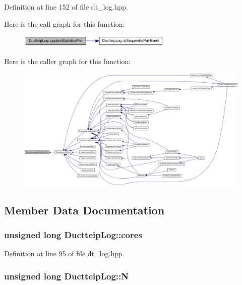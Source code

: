 Definition at line 152 of file dt\_\-log.hpp.

Here is the call graph for this function:\nopagebreak
\begin{figure}[H]
\begin{center}
\leavevmode
\includegraphics[width=208pt]{class_ductteip_log_a10e6b8ed2cea31010e9937b5d0f5e685_cgraph}
\end{center}
\end{figure}


Here is the caller graph for this function:\nopagebreak
\begin{figure}[H]
\begin{center}
\leavevmode
\includegraphics[width=420pt]{class_ductteip_log_a10e6b8ed2cea31010e9937b5d0f5e685_icgraph}
\end{center}
\end{figure}


\subsection{Member Data Documentation}
\hypertarget{class_ductteip_log_a1495cf729c4097e29382d4566257fb2d}{
\subsubsection[{cores}]{\setlength{\rightskip}{0pt plus 5cm}unsigned long {\bf DuctteipLog::cores}}}
\label{class_ductteip_log_a1495cf729c4097e29382d4566257fb2d}


Definition at line 95 of file dt\_\-log.hpp.\hypertarget{class_ductteip_log_ae26d79785cddd22afd0ef968ed54cdba}{
\subsubsection[{N}]{\setlength{\rightskip}{0pt plus 5cm}unsigned long {\bf DuctteipLog::N}}}
\label{class_ductteip_log_ae26d79785cddd22afd0ef968ed54cdba}


